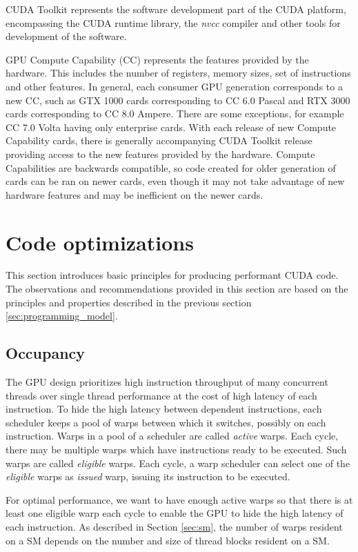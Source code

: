 CUDA Toolkit represents the software development part of the CUDA platform, encompassing the CUDA runtime library, the \textit{nvcc} compiler and other tools for development of the software.

GPU Compute Capability (CC) represents the features provided by the hardware. This includes the number of registers, memory sizes, set of instructions and other features. In general, each consumer GPU generation corresponds to a new CC, such as GTX 1000 cards corresponding to CC 6.0 Pascal and RTX 3000 cards corresponding to CC 8.0 Ampere. There are some exceptions, for example CC 7.0 Volta having only enterprise cards. With each release of new Compute Capability cards, there is generally accompanying CUDA Toolkit release providing access to the new features provided by the hardware. Compute Capabilities are backwards compatible, so code created for older generation of cards can be ran on newer cards, even though it may not take advantage of new hardware features and may be inefficient on the newer cards.

\section{Code optimizations}

This section introduces basic principles for producing performant CUDA code.
The observations and recommendations provided in this section are based on the principles and properties described in the previous section \ref{sec:programming_model}.

\subsection{Occupancy}

The GPU design prioritizes high instruction throughput of many concurrent threads over single thread performance at the cost of high latency of each instruction. To hide the high latency between dependent instructions, each scheduler keeps a pool of warps between which it switches, possibly on each instruction. Warps in a pool of a scheduler are called \textit{active} warps.
Each cycle, there may be multiple warps which have instructions ready to be executed. Such warps are called \textit{eligible} warps.
Each cycle, a warp scheduler can select one of the \textit{eligible} warps as \textit{issued} warp, issuing its instruction to be executed.

For optimal performance, we want to have enough active warps so that there is at least one eligible warp each cycle to enable the GPU to hide the high latency of each instruction. As described in Section \ref{sec:sm}, the number of warps resident on a SM depends on the number and size of thread blocks resident on a SM.

